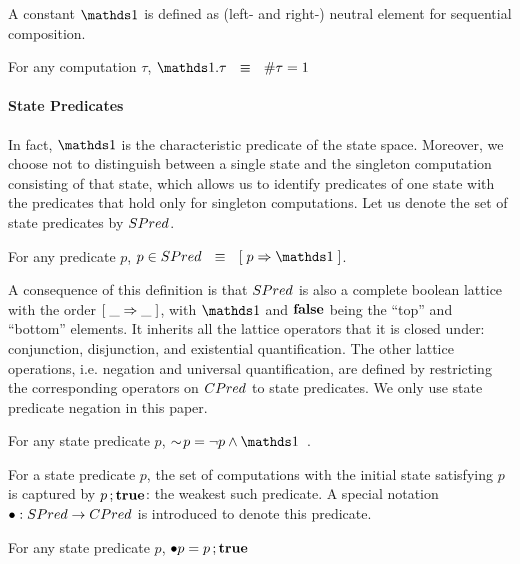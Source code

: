 A constant $\one$ is defined as (left- and right-) neutral element for
sequential composition.
\begin{Definition} For any computation $\tau$, $\one.\tau  \Wide{\eqv}  \size \tau = 1$
\end{Definition}

\paragraph{State Predicates}
In fact, $\one$ is the characteristic predicate of the state space.
Moreover, we choose not to distinguish between a single state and the
singleton computation consisting of that state, which allows us to identify
predicates of one state with the predicates that hold only for singleton
computations.  Let us denote the set of state predicates by 
$SPred$.
\begin{Definition} For any predicate $p$,
    $p \in \SPred \Wide{\eqv} \ew {p \implies \one}$.
\end{Definition}

A consequence of this definition is that $SPred$ is also a complete
boolean lattice with the order $[\;  \_ \Rightarrow \_ \;]$, with $\one$ and
$\mathbf{false}$ being the ``top'' and ``bottom'' elements.  It inherits all
the lattice operators that it is closed under: conjunction,
disjunction, and existential quantification.  The other lattice
operations, i.e. negation and universal quantification, are defined by
restricting the corresponding operators on $CPred$ to state
predicates.  We only use state predicate negation in this paper.
\begin{Definition} For
  any state predicate $p$,
  $\spneg p = \neg p \land \one$~.
\end{Definition}

For a state predicate $p$, the set of computations with the initial
state satisfying $p$ is captured by $p\,;\mathbf{true}$: the weakest such 
predicate.  A special notation $\bullet : SPred \rightarrow CPred$ 
is introduced to denote this predicate.
\begin{Definition} For any state predicate $p$,
  $\bullet p = p\,;\mathbf{true}$
\end{Definition}

